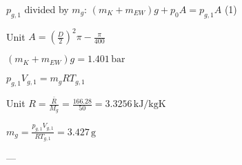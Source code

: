 \( p_{g,1} \) divided by \( m_g \):  
\((m_K + m_{EW}) g + p_0 A = p_{g,1} A \) (1)  

Unit \( A = \left(\frac{D}{2}\right)^2 \pi - \frac{\pi}{400} \)  

\((m_K + m_{EW}) g = 1.401 \, \text{bar}\)  

\( p_{g,1} V_{g,1} = m_g R T_{g,1} \)  

Unit \( R = \frac{\bar{R}}{M_g} = \frac{166.28}{50} = 3.3256 \, \text{kJ/kgK} \)  

\( m_g = \frac{p_{g,1} V_{g,1}}{R T_{g,1}} = 3.427 \, \text{g} \)  

---